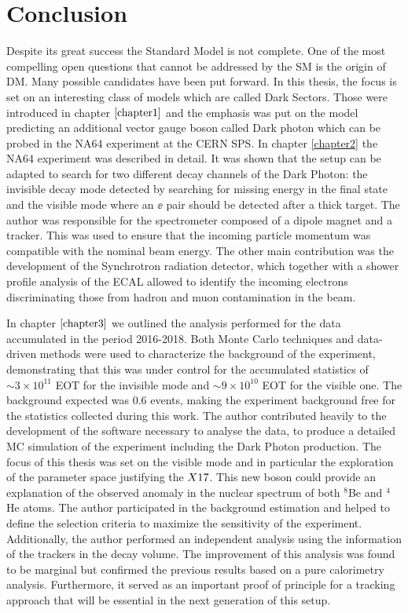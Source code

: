 
\chapter{Conclusion} %
\label{chapter6}

Despite its great success the Standard Model is not complete. One of the most compelling open questions that cannot be addressed by the SM is the origin of DM. Many possible candidates have been put forward. In this thesis, the focus is set on an interesting class of models which are called Dark Sectors. Those were introduced in chapter $\ref{chapter1}$ and the emphasis was put on the model predicting an additional vector gauge boson called Dark photon which can be probed in the NA64 experiment at the CERN SPS. In chapter \ref{chapter2} the NA64 experiment was described in detail. It was shown that the setup can be adapted to search for two different decay channels of the Dark Photon: the invisible decay mode detected by searching for missing energy in the final state and the visible mode where an $\ee$ pair should be detected after a thick target. The author was responsible for the spectrometer composed of a dipole magnet and a tracker. This was used to ensure that the incoming particle momentum was compatible with the nominal beam energy. The other main contribution was the development of the Synchrotron radiation detector, which together with a shower profile analysis of the ECAL allowed to identify the incoming electrons discriminating those from hadron and muon contamination in the beam.

In chapter $\ref{chapter3}$ we outlined the analysis performed for the data accumulated in the period 2016-2018. Both Monte Carlo techniques and data-driven methods were used to characterize the background of the experiment, demonstrating that this was under control for the accumulated statistics of $\sim 3 \times 10^{11}$ EOT for the invisible mode and $\sim 9 \times 10^{10}$ EOT for the visible one. The background expected was 0.6 events, making the experiment background free for the statistics collected during this work. The author contributed heavily to the development of the software necessary to analyse the data, to produce a detailed MC simulation of the experiment including the Dark Photon production. The focus of this thesis was set on the visible mode and in particular the exploration of the parameter space justifying the $X17$. This new boson could provide an explanation of the observed anomaly in the nuclear spectrum of both $^8$Be and $^4$He atoms. The author participated in the background estimation and helped to define the selection criteria to maximize the sensitivity of the experiment. Additionally, the author performed an independent analysis using the information of the trackers in the decay volume. The improvement of this analysis was found to be marginal but confirmed the previous results based on a pure calorimetry analysis. Furthermore, it served as an important proof of principle for a tracking approach that will be essential in the next generation of this setup.

